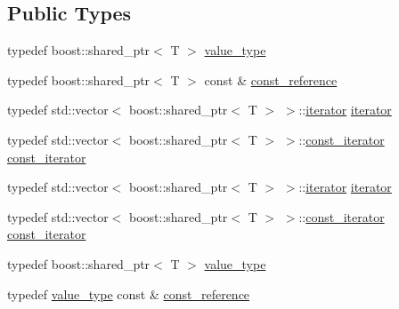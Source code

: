 \subsection*{Public Types}
\begin{DoxyCompactItemize}
\item 
typedef boost::shared\_\-ptr$<$ T $>$ \hyperlink{class_container_aa44714b9a736d2cfd2e01a87ad1c001b}{value\_\-type}
\item 
typedef boost::shared\_\-ptr$<$ T $>$ const \& \hyperlink{class_container_a9aaab0502055ee85ce5d3633fbca2675}{const\_\-reference}
\item 
typedef std::vector$<$ boost::shared\_\-ptr$<$ T $>$ $>$::\hyperlink{class_container_afe880028d8304353129f47cd1d28c20a}{iterator} \hyperlink{class_container_afe880028d8304353129f47cd1d28c20a}{iterator}
\item 
typedef std::vector$<$ boost::shared\_\-ptr$<$ T $>$ $>$::\hyperlink{class_container_a5eabadaffdd508cb623c955eb0af1518}{const\_\-iterator} \hyperlink{class_container_a5eabadaffdd508cb623c955eb0af1518}{const\_\-iterator}
\item 
typedef std::vector$<$ boost::shared\_\-ptr$<$ T $>$ $>$::\hyperlink{class_container_afe880028d8304353129f47cd1d28c20a}{iterator} \hyperlink{class_container_afe880028d8304353129f47cd1d28c20a}{iterator}
\item 
typedef std::vector$<$ boost::shared\_\-ptr$<$ T $>$ $>$::\hyperlink{class_container_a5eabadaffdd508cb623c955eb0af1518}{const\_\-iterator} \hyperlink{class_container_a5eabadaffdd508cb623c955eb0af1518}{const\_\-iterator}
\item 
typedef boost::shared\_\-ptr$<$ T $>$ \hyperlink{class_container_aa44714b9a736d2cfd2e01a87ad1c001b}{value\_\-type}
\item 
typedef \hyperlink{class_container_aa44714b9a736d2cfd2e01a87ad1c001b}{value\_\-type} const \& \hyperlink{class_container_a8dd7ae9d0687e11d873f98206e961ac1}{const\_\-reference}
\end{DoxyCompactItemize}
